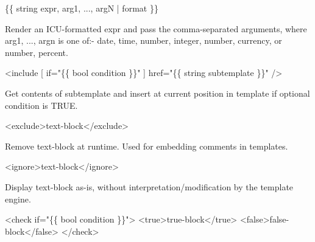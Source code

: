 \begin{DoxyCode}
\{\{ string expr, arg1, ..., argN | format \}\}
\end{DoxyCode}

\begin{DoxyItemize}
\item Render an I\+C\+U-\/formatted {\ttfamily expr} and pass the comma-\/separated arguments, where {\ttfamily arg1, ..., argn} is one of\+:-\/ {\ttfamily \textquotesingle{}date\textquotesingle{}}, {\ttfamily \textquotesingle{}time\textquotesingle{}}, {\ttfamily \textquotesingle{}number, integer\textquotesingle{}}, {\ttfamily \textquotesingle{}number, currency\textquotesingle{}}, or {\ttfamily \textquotesingle{}number, percent\textquotesingle{}}.
\end{DoxyItemize}


\begin{DoxyCode}
<include
    [ if="\{\{ bool condition \}\}" ]
    href="\{\{ string subtemplate \}\}"
/>
\end{DoxyCode}

\begin{DoxyItemize}
\item Get contents of {\ttfamily subtemplate} and insert at current position in template if optional condition is {\ttfamily T\+R\+UE}.
\end{DoxyItemize}


\begin{DoxyCode}
<exclude>text-block</exclude>
\end{DoxyCode}

\begin{DoxyItemize}
\item Remove {\ttfamily text-\/block} at runtime. Used for embedding comments in templates.
\end{DoxyItemize}


\begin{DoxyCode}
<ignore>text-block</ignore>
\end{DoxyCode}

\begin{DoxyItemize}
\item Display {\ttfamily text-\/block} as-\/is, without interpretation/modification by the template engine.
\end{DoxyItemize}


\begin{DoxyCode}
<check if="\{\{ bool condition \}\}">
    <true>true-block</true>
    <false>false-block</false>
</check>
\end{DoxyCode}


